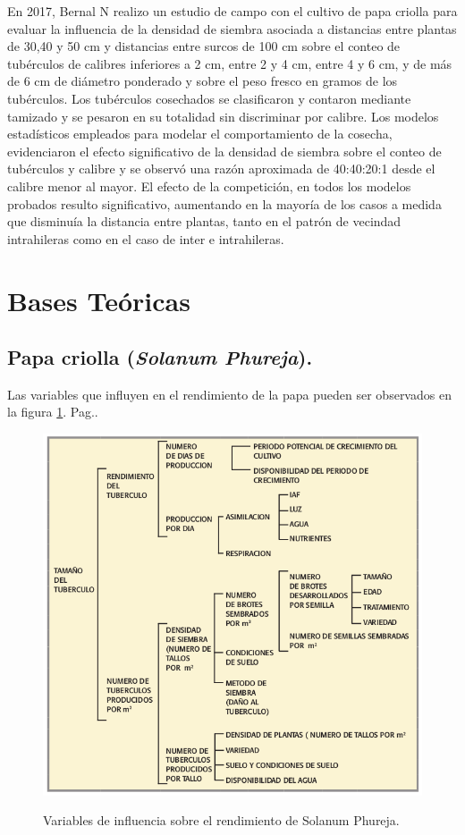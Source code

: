 En 2017, Bernal N realizo un estudio de campo con el cultivo de papa criolla para evaluar la influencia de la densidad de siembra asociada a distancias entre plantas de 30,40 y 50 cm y distancias entre surcos de 100 cm sobre el conteo de tubérculos de calibres inferiores a 2 cm, entre 2 y 4 cm, entre 4 y 6 cm, y de más de 6 cm de diámetro ponderado y sobre el peso fresco en gramos de los tubérculos. Los tubérculos cosechados se clasificaron y contaron mediante tamizado y se pesaron en su totalidad sin discriminar por calibre. Los modelos estadísticos empleados para modelar el comportamiento de la cosecha, evidenciaron el efecto significativo de la densidad de siembra sobre el conteo de tubérculos y calibre y se observó una razón aproximada de 40:40:20:1 desde el calibre menor al mayor. El efecto de la competición, en todos los modelos probados resulto significativo, aumentando en la mayoría de los casos a medida que disminuía la distancia entre plantas, tanto en el patrón de vecindad intrahileras como en el caso de inter e intrahileras.

\section{Bases Teóricas}

\subsection{Papa criolla (\textit{Solanum Phureja}).}

Las variables que influyen en el rendimiento de la papa pueden ser observados en la figura \ref{fig:arch}. Pag.\pageref{fig:arch}.\\
\begin{figure}[h]
	\caption{Variables de influencia sobre el rendimiento de Solanum Phureja.}
	\centering
	\includegraphics[scale=0.5]{variables.png}
	\label{fig:arch}
\end{figure}

